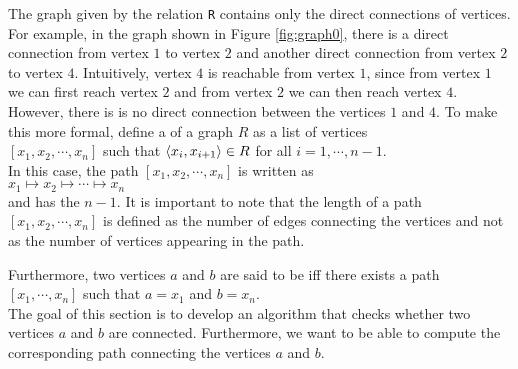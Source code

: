 \noindent
The graph given by the relation \texttt{R} contains only the direct connections of vertices.  For example, in
the graph shown in Figure \ref{fig:graph0}, there is a direct connection from vertex $1$ to vertex $2$ and
another direct connection from vertex $2$ to vertex $4$.  Intuitively, vertex $4$ is reachable from vertex $1$,
since from vertex $1$ we can first reach vertex $2$ and from vertex $2$ we can then reach vertex $4$.  However,
there is is no direct connection between the vertices $1$ and $4$.  To make this more formal, define
a \colorbox{amethyst}{} 
of a graph $R$ as a list of vertices
\\[0.2cm]
\hspace*{1.3cm}
$[x_1, x_2, \cdots, x_n]$ \quad such that \quad $\pair(x_i,x_{i+1}) \in R$ \quad for all $i=1,\cdots,n-1$.
\\[0.2cm]
In this case, the path $[x_1, x_2, \cdots, x_n]$ is written as
\\[0.2cm]
\hspace*{1.3cm}
$x_1 \mapsto x_2 \mapsto \cdots \mapsto x_n$
\\[0.2cm]
and has the  $n-1$.  It is important to note that the length of a path
$[x_1,x_2,\cdots,x_n]$ is defined as the number of edges connecting the vertices and not as the
number of vertices appearing in the path.

Furthermore,  two vertices $a$ and $b$ are said to be \colorbox{amethyst}{} iff there exists a path
\\[0.2cm]
\hspace*{1.3cm}
$[x_1,\cdots,x_n]$ \quad such that \quad $a = x_1$ \quad and \quad $b = x_n$.
\\[0.2cm]
The goal of this section is to develop an algorithm that checks whether two vertices $a$ and $b$ are connected.
Furthermore, we want to be able to compute the corresponding path connecting the vertices $a$ and $b$.


